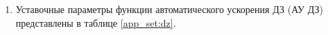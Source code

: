 \begin{enumerate}
\begin{enumerate}
\item
Уставочные параметры функции автоматического ускорения ДЗ (АУ ДЗ) представлены в таблице \ref{app_set:dz}.

\end{enumerate}

\end{enumerate}